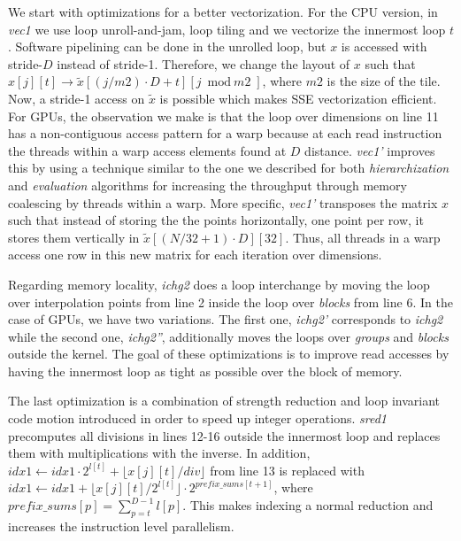 We start with optimizations for a better vectorization. For the CPU version,
in \textit{vec1} we use loop unroll-and-jam, loop tiling and we vectorize the
innermost loop $t$. Software pipelining can be done in the unrolled loop, but
$x$ is accessed with stride-$D$ instead of stride-1. Therefore, we change the
layout of $x$ such that $x[j][t] \rightarrow \tilde{x}[(j/\textit{m2}) \cdot D +
t][j \bmod \textit{m2}]$, where $\textit{m2}$ is the size of the tile. Now, a
stride-1 access on $\tilde{x}$ is possible which makes SSE vectorization
efficient. For GPUs, the observation we make is that the loop over dimensions on
line 11 has a non-contiguous access pattern for a warp because at each read
instruction the threads within a warp access elements found at $D$ distance.
\textit{vec1'} improves this by using a technique similar to the one we
described for both \textit{hierarchization} and \textit{evaluation} algorithms
for increasing the throughput through memory coalescing by threads within a
warp. More specific, \textit{vec1'} transposes the matrix $x$ such that instead
of storing the the points horizontally, one point per row, it stores them
vertically in $\tilde{x}[(N/32+1) \cdot D][32]$. Thus, all threads in a warp
access one row in this new matrix for each iteration over dimensions.

Regarding memory locality, \textit{ichg2} does a loop interchange by moving the
loop over interpolation points from line 2 inside the loop over \textit{blocks}
from line 6. In the case of GPUs, we have two variations. The first one,
\textit{ichg2'} corresponds to \textit{ichg2} while the second one,
\textit{ichg2''}, additionally moves the loops over \textit{groups} and
\textit{blocks} outside the kernel. The goal of these optimizations is to
improve read accesses by having the innermost loop as tight as possible over the
block of memory.

The last optimization is a combination of strength reduction and loop invariant
code motion introduced in order to speed up integer operations. \textit{sred1}
precomputes all divisions in lines 12-16 outside the innermost loop and replaces
them with multiplications with the inverse. In addition, $idx1 \leftarrow
idx1 \cdot 2^{l[t]} + \lfloor x[j][t] / div \rfloor$ from line 13 is
replaced with $idx1 \leftarrow idx1 + \lfloor x[j][t] / 2^{l[t]} \rfloor
\cdot 2^{prefix\_sums[t + 1]}$, where $prefix\_sums[p] = \sum_{p=t}^{D-1}l[p]$.
This makes indexing a normal reduction and increases the instruction level
parallelism.

